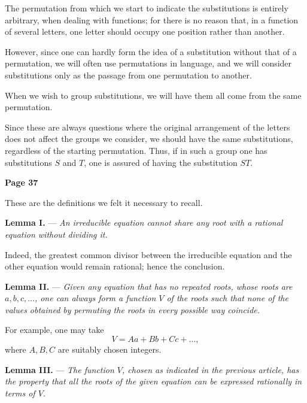 \documentclass{article}
\begin{document}
\smallskip

The permutation from which we start to indicate the substitutions is entirely arbitrary, when dealing with functions; for there is no reason that, in a function of several letters, one letter should occupy one position rather than another.

\smallskip

However, since one can hardly form the idea of a substitution without that of a permutation, we will often use permutations in language, and we will consider substitutions only as the passage from one permutation to another.

\smallskip

When we wish to group substitutions, we will have them all come from the same permutation.

\smallskip

Since these are always questions where the original arrangement of the letters does not affect the groups we consider, we should have the same substitutions, regardless of the starting permutation. Thus, if in such a group one has substitutions \(S\) and \(T\), one is assured of having the substitution \(ST\). 

\newpage

\centerline{\textbf{Page 37}}

\medskip

These are the definitions we felt it necessary to recall.

\smallskip


\textbf{Lemma I.} --- \textit{An irreducible equation cannot share any root with a rational equation without dividing it.}

\smallskip

Indeed, the greatest common divisor between the irreducible equation and the other equation would remain rational; hence the conclusion.

\smallskip


\textbf{Lemma II.} --- \textit{Given any equation that has no repeated roots, whose roots are \(a, b, c, \dots\), one can always form a function \(V\) of the roots such that none of the values obtained by permuting the roots in every possible way coincide.}

\smallskip

For example, one may take
\[
V = Aa + Bb + Cc + \dots,
\]
where \(A, B, C\) are suitably chosen integers.

\medskip

\textbf{Lemma III.} --- \textit{The function \(V\), chosen as indicated in the previous article, has the property that all the roots of the given equation can be expressed rationally in terms of \(V\).}
\end{document}
